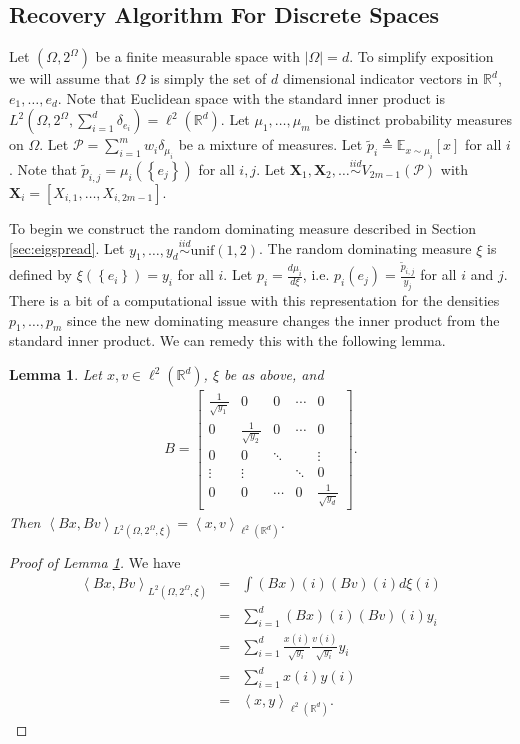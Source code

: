 \documentclass[aos,preprint]{imsart}
\def\rn{\mathbb{R}}
\def\l{\left}
\def\r{\right}
\def\sP{\mathscr{P}}
\def\bX{\mathbf{X}}
\def\simiid{\overset{iid}{\sim}}
\def\lrd{{\ell^2\left( \rn^d \right)}}
\theoremstyle{plain}
\newtheorem{lem}{Lemma}[section]
\theoremstyle{defintion}
\begin{document}
\subsection{Recovery Algorithm For Discrete Spaces}
Let $\left( \Omega, 2^\Omega \right)$ be a finite measurable space with $ \l| \Omega \r| = d$. To simplify exposition we will assume that $\Omega$ is simply the set of $d$ dimensional indicator vectors in $\rn^d$, $e_1,\ldots, e_d$. Note that Euclidean space with the standard inner product is $L^2\left( \Omega,2^{\Omega}, \sum_{i=1}^d \delta_{e_i} \right) = \lrd$. Let $\mu_1, \ldots, \mu_m$ be distinct probability measures on $\Omega$. Let $\sP = \sum_{i=1}^m w_i \delta_{\mu_i}$ be a mixture of measures. Let $\tilde{p}_i \triangleq \mathbb{E}_{x \sim \mu_i}\left[ x \right]$ for all $i$. Note that $\tilde{p}_{i,j} = \mu_i\left( \left\{ e_j \right\} \right)$ for all $i,j$. Let $\bX_1,\bX_2,\ldots \simiid V_{2m-1}\left( \sP \right)$ with $\bX_i = \left[ X_{i,1},\ldots, X_{ i,2m-1 } \right]$. 

To begin we construct the random dominating measure described in Section \ref{sec:eigspread}. Let $y_1,\ldots,y_d \simiid \text{unif}\left( 1,2 \right)$. The random dominating measure $\xi$ is defined by $\xi\left( \left\{ e_i \right\} \right) = y_i$ for all $i$. Let $p_i = \frac{d \mu_i}{d \xi}$, i.e. $p_i \left( e_{j} \right) =  \frac{\tilde{p}_{i,j}}{y_j}$ for all $i$ and $j$. There is a bit of a computational issue with this representation for the densities $p_1,\ldots, p_m$ since the new dominating measure changes the inner product from the standard inner product. We can remedy this with the following lemma.
\begin{lem}\label{lem:domtrans}
	Let $x,v \in \lrd$, $\xi$ be as above, and 
	\begin{eqnarray*}
		B =\l[	\begin{matrix}
				\frac{1}{\sqrt{y_1}} & 0& 0 & \cdots & 0\\
				0& \frac{1}{\sqrt{y_2}} & 0 &\cdots & 0 \\
				0&0&\ddots&&\vdots\\
				\vdots &\vdots&&\ddots& 0\\
				0& 0 & \cdots& 0 &  \frac{1}{\sqrt{y_d}}
		\end{matrix}\r].
	\end{eqnarray*}
	Then $ \l<Bx,Bv \r>_{L^2\left( \Omega,2^{\Omega},\xi \right)}  = \l<x,v\r>_\lrd$.
\end{lem}
\begin{proof}[Proof of Lemma \ref{lem:domtrans}]
	We have
	\begin{eqnarray*}
		\l<Bx,Bv \r>_{L^2\left( \Omega,2^{\Omega},\xi \right)} 
		&=& \int (Bx)(i) (Bv)(i) d\xi(i)\\
		&=& \sum_{i=1}^d (Bx)(i) (Bv)(i) y_i\\
		       &=& \sum_{i=1}^d \frac{x(i)}{\sqrt{y_i}} \frac{v(i)}{\sqrt{y_i}} y_i\\
			      &=& \sum_{i=1}^d x(i) y(i)\\
			      &=& \l<x,y\r>_\lrd.
	\end{eqnarray*}
\end{proof}
\end{document}
